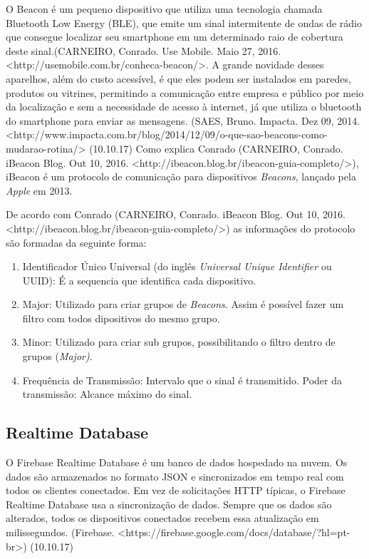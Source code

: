 \documentclass[
	12pt,				%
	oneside,			%
	a4paper,			%
	brazil				%
]{abntex2}
\begin{document}
{O Beacon é um pequeno dispositivo que utiliza uma tecnologia chamada Bluetooth Low Energy (BLE), que emite um sinal intermitente de ondas de rádio que consegue localizar seu smartphone em um determinado raio de cobertura deste sinal.(CARNEIRO, Conrado. Use Mobile. Maio 27, 2016. <http://usemobile.com.br/conheca-beacon/>. 
A grande novidade desses aparelhos, além do custo acessível, é que eles podem ser instalados em paredes, produtos ou vitrines, permitindo a comunicação entre empresa e público por meio da localização e sem a necessidade de acesso à internet, já que utiliza o bluetooth do smartphone para enviar as mensagens. (SAES, Bruno. Impacta. Dez 09, 2014. <http://www.impacta.com.br/blog/2014/12/09/o-que-sao-beacons-como-mudarao-rotina/> (10.10.17)
Como explica Conrado (CARNEIRO, Conrado. iBeacon Blog. Out 10, 2016. <http://ibeacon.blog.br/ibeacon-guia-completo/>), iBeacon é um protocolo de comunicação para dispositivos \textit{Beacons}, lançado pela \textit{Apple} em 2013. 

De acordo com Conrado (CARNEIRO, Conrado. iBeacon Blog. Out 10, 2016. <http://ibeacon.blog.br/ibeacon-guia-completo/>) as informações do protocolo são formadas da seguinte forma:\\

\begin{enumerate}


\item Identificador Único Universal (do inglês \textit{Universal Unique Identifier} ou UUID): É a sequencia que identifica cada dispositivo.
\item Major: Utilizado para criar grupos de \textit{Beacons}. Assim é possível fazer um filtro com todos dipositivos do mesmo grupo.
\item Minor: Utilizado para criar sub grupos, possibilitando o filtro dentro de grupos (\textit{Major)}.
\item Frequência de Transmissão: Intervalo que o sinal é transmitido.
Poder da transmissão: Alcance máximo do sinal.

\end{enumerate}

\subsection{Realtime Database}

O Firebase Realtime Database é um banco de dados hospedado na nuvem. Os dados são armazenados no formato JSON e sincronizados em tempo real com todos os clientes conectados.
Em vez de solicitações HTTP típicas, o Firebase Realtime Database usa a sincronização de dados. Sempre que os dados são alterados, todos os dispositivos conectados recebem essa atualização em milissegundos. (Firebase. <https://firebase.google.com/docs/database/?hl=pt-br>) (10.10.17)

}
\end{document}
